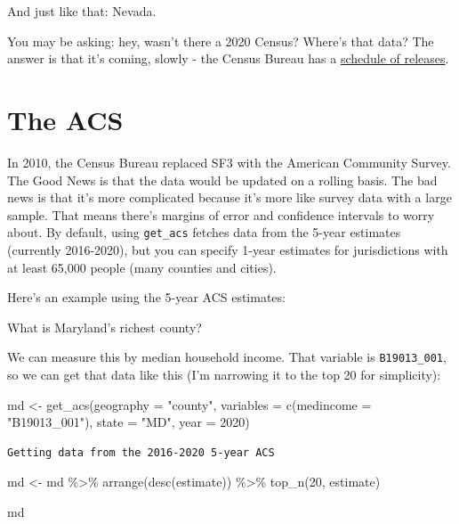 \documentclass[
  letterpaper,
  DIV=11,
  numbers=noendperiod]{scrreprt}
\newenvironment{Shaded}{\begin{snugshade}}{\end{snugshade}}
\newcommand{\AttributeTok}[1]{\textcolor[rgb]{0.40,0.45,0.13}{#1}}
\newcommand{\DecValTok}[1]{\textcolor[rgb]{0.68,0.00,0.00}{#1}}
\newcommand{\FunctionTok}[1]{\textcolor[rgb]{0.28,0.35,0.67}{#1}}
\newcommand{\NormalTok}[1]{\textcolor[rgb]{0.00,0.23,0.31}{#1}}
\newcommand{\OtherTok}[1]{\textcolor[rgb]{0.00,0.23,0.31}{#1}}
\newcommand{\SpecialCharTok}[1]{\textcolor[rgb]{0.37,0.37,0.37}{#1}}
\newcommand{\StringTok}[1]{\textcolor[rgb]{0.13,0.47,0.30}{#1}}
\begin{document}
And just like that: Nevada.

You may be asking: hey, wasn't there a 2020 Census? Where's that data?
The answer is that it's coming, slowly - the Census Bureau has a
\href{https://www.census.gov/programs-surveys/popest/about/schedule.html}{schedule
of releases}.

\hypertarget{the-acs}{%
\section{The ACS}\label{the-acs}}

In 2010, the Census Bureau replaced SF3 with the American Community
Survey. The Good News is that the data would be updated on a rolling
basis. The bad news is that it's more complicated because it's more like
survey data with a large sample. That means there's margins of error and
confidence intervals to worry about. By default, using \texttt{get\_acs}
fetches data from the 5-year estimates (currently 2016-2020), but you
can specify 1-year estimates for jurisdictions with at least 65,000
people (many counties and cities).

Here's an example using the 5-year ACS estimates:

What is Maryland's richest county?

We can measure this by median household income. That variable is
\texttt{B19013\_001}, so we can get that data like this (I'm narrowing
it to the top 20 for simplicity):

\begin{Shaded}
\begin{Highlighting}[]
\NormalTok{md }\OtherTok{\textless{}{-}} \FunctionTok{get\_acs}\NormalTok{(}\AttributeTok{geography =} \StringTok{"county"}\NormalTok{,}
              \AttributeTok{variables =} \FunctionTok{c}\NormalTok{(}\AttributeTok{medincome =} \StringTok{"B19013\_001"}\NormalTok{),}
              \AttributeTok{state =} \StringTok{"MD"}\NormalTok{,}
              \AttributeTok{year =} \DecValTok{2020}\NormalTok{)}
\end{Highlighting}
\end{Shaded}

\begin{verbatim}
Getting data from the 2016-2020 5-year ACS
\end{verbatim}

\begin{Shaded}
\begin{Highlighting}[]
\NormalTok{md }\OtherTok{\textless{}{-}}\NormalTok{ md }\SpecialCharTok{\%\textgreater{}\%} \FunctionTok{arrange}\NormalTok{(}\FunctionTok{desc}\NormalTok{(estimate)) }\SpecialCharTok{\%\textgreater{}\%} \FunctionTok{top\_n}\NormalTok{(}\DecValTok{20}\NormalTok{, estimate)}

\NormalTok{md}
\end{Highlighting}
\end{Shaded}
\end{document}
